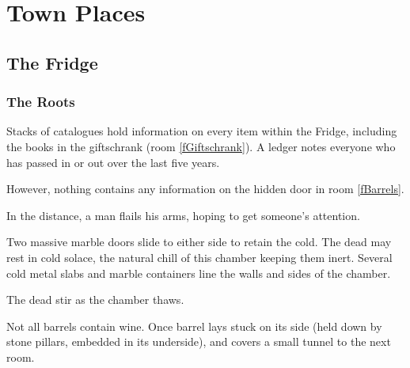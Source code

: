 \chapter{Town Places}

\section{The Fridge}

\begin{multicols}{2}

\noindent

\renewcommand\csComments{
  \callout{18,5}{-2,-2}{\ref{fGnomePassages}: \nameref{fGnomePassages}}{}
  \callout{7.5,0}{0,2.5}{\ref{fGuardDoor}: \nameref{fGuardDoor}}{}
  \mapFeature{15,9}{S}
}


\subsection{The Roots}




Stacks of catalogues hold information on every item within the Fridge, including the books in the giftschrank (room \vref{fGiftschrank}).
A ledger notes everyone who has passed in or out over the last five years.

However, nothing contains any information on the hidden door in room \vref{fBarrels}.


In the distance, a man flails his arms, hoping to get someone's attention.


Two massive marble doors slide to either side to retain the cold.
The dead may rest in cold solace, the natural chill of this chamber keeping them inert.
Several cold metal slabs and marble containers line the walls and sides of the chamber. 

The dead stir as the chamber thaws. 


Not all barrels contain wine.
Once barrel lays stuck on its side (held down by stone pillars, embedded in its underside), and covers a small tunnel to the next room.


\end{multicols}
